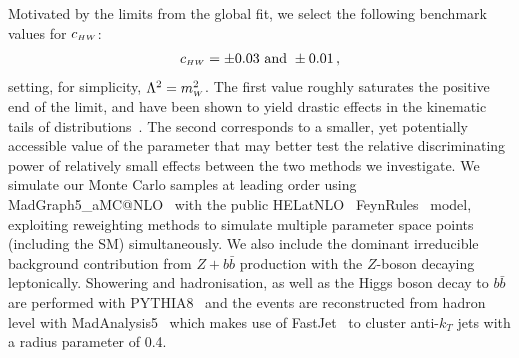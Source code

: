 Motivated by the limits from the global fit, we select the following benchmark values for $c_{\scriptscriptstyle HW}$:
\begin{align}
    c_{\scriptscriptstyle HW} = \pm 0.03 \text{ and } \pm0.01\,,
\end{align}
setting, for simplicity, $\Lambda^2=m_{\scriptscriptstyle W}^2$. The first value roughly saturates the positive end of the limit, and have been shown to yield drastic effects in the kinematic tails of distributions~\cite{Degrande:2016dqg}. The second corresponds to a smaller, yet potentially accessible value of the parameter that may better test the relative discriminating power of relatively small effects between the two methods we investigate. We simulate our Monte Carlo samples at leading order using {\sc MadGraph5\_aMC@NLO}~\cite{Alwall:2014hca} with the public {\sc HELatNLO}~\cite{Degrande:2016dqg,Alloul:2013naa} {\sc FeynRules}~\cite{Alloul:2013bka} model, exploiting reweighting methods to simulate multiple parameter space points (including the SM) simultaneously. We also include the dominant irreducible background contribution from $Z + b\bar{b}$ production with the $Z$-boson decaying leptonically. Showering and hadronisation, as well as the Higgs boson decay to $b\bar{b}$ are performed with {\sc PYTHIA8}~\cite{pythia8} and the events are reconstructed from hadron level with {\sc MadAnalysis5}~\cite{Conte:2012fm} which makes use of {\sc FastJet}~\cite{Cacciari:2011ma} to cluster anti-$k_T$ jets with a radius parameter of 0.4.

